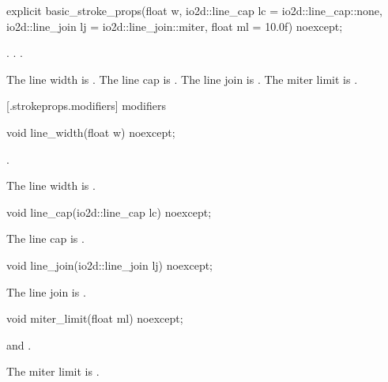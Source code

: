 %
\begin{itemdecl}
explicit basic_stroke_props(float w, io2d::line_cap lc = io2d::line_cap::none,
  io2d::line_join lj = io2d::line_join::miter,
  float ml = 10.0f) noexcept;
\end{itemdecl}
\begin{itemdescr}
\pnum
\requires
{}. . .

\pnum
\effects
The line width is . The line cap is . The line join is . The miter limit is .
\end{itemdescr}

 [\iotwod.strokeprops.modifiers] { modifiers}

%
\begin{itemdecl}
void line_width(float w) noexcept;
\end{itemdecl}
\begin{itemdescr}
\pnum
\requires
{}.

\pnum
\effects
The line width is .
\end{itemdescr}

%
\begin{itemdecl}
void line_cap(io2d::line_cap lc) noexcept;
\end{itemdecl}
\begin{itemdescr}
\pnum
\effects
The line cap is .
\end{itemdescr}

%
\begin{itemdecl}
void line_join(io2d::line_join lj) noexcept;
\end{itemdecl}
\begin{itemdescr}
\pnum
\effects
The line join is .
\end{itemdescr}

%
\begin{itemdecl}
void miter_limit(float ml) noexcept;
\end{itemdecl}
\begin{itemdescr}
\pnum
\requires
{} and .

\pnum
\effects
The miter limit is .
\end{itemdescr}

